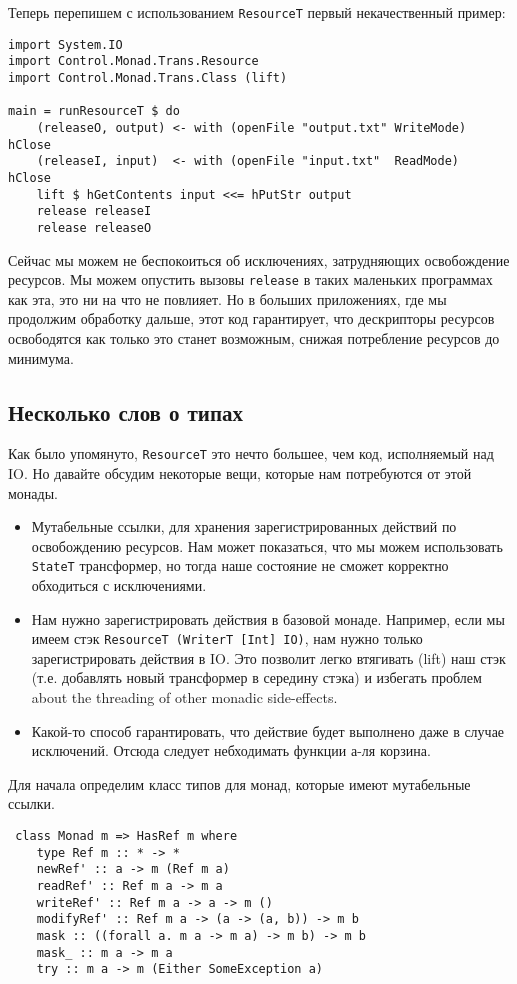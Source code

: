 Теперь перепишем с использованием \lstinline'ResourceT' первый некачественный пример:
\begin{lstlisting}
import System.IO
import Control.Monad.Trans.Resource
import Control.Monad.Trans.Class (lift)

main = runResourceT $ do
    (releaseO, output) <- with (openFile "output.txt" WriteMode) hClose
    (releaseI, input)  <- with (openFile "input.txt"  ReadMode)  hClose
    lift $ hGetContents input <<= hPutStr output
    release releaseI
    release releaseO
\end{lstlisting}

Сейчас мы можем не беспокоиться об исключениях, затрудняющих освобождение ресурсов. Мы
можем опустить вызовы \verb=release= в таких маленьких программах как эта, это ни на что
не повлияет. Но в больших приложениях, где мы продолжим обработку дальше, этот код
гарантирует, что дескрипторы ресурсов освободятся как только это станет возможным, снижая
потребление ресурсов до минимума.

\subsection{Несколько слов о типах}

Как было упомянуто, \lstinline'ResourceT' это нечто большее, чем код, исполняемый над IO.
Но давайте обсудим некоторые вещи, которые нам потребуются от этой монады.
\begin{itemize}
\item Мутабельные ссылки, для хранения зарегистрированных действий по освобождению
ресурсов. Нам может показаться, что мы можем использовать \lstinline'StateT' трансформер,
но тогда наше состояние не сможет корректно обходиться с исключениями.
\item Нам нужно зарегистрировать действия в базовой монаде. Например, если мы имеем 
стэк \lstinline'ResourceT (WriterT [Int] IO)', нам нужно только зарегистрировать
действия в IO. Это позволит легко втягивать (lift) наш стэк (т.е. добавлять новый
трансформер в середину стэка) и избегать проблем about the
threading of other monadic side-effects.
\item Какой-то способ гарантировать, что действие будет выполнено даже в случае
исключений. Отсюда следует небходимать функции а-ля корзина.
\end{itemize}

Для начала определим класс типов для монад, которые имеют мутабельные ссылки.
\begin{lstlisting}
 class Monad m => HasRef m where
    type Ref m :: * -> *
    newRef' :: a -> m (Ref m a)
    readRef' :: Ref m a -> m a
    writeRef' :: Ref m a -> a -> m ()
    modifyRef' :: Ref m a -> (a -> (a, b)) -> m b
    mask :: ((forall a. m a -> m a) -> m b) -> m b
    mask_ :: m a -> m a
    try :: m a -> m (Either SomeException a)
\end{lstlisting}

